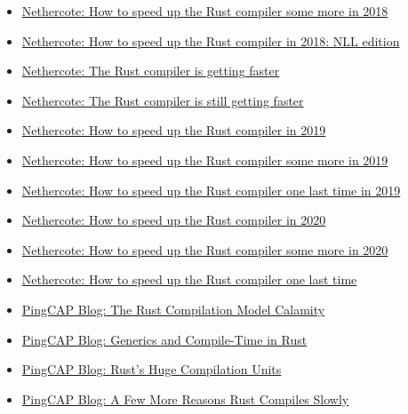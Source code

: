 \documentclass[12pt, a4paper]{report}
\begin{document}
\begin{itemize}[noitemsep]
\begin{itemize}[noitemsep]
	\item \href{https://blog.mozilla.org/nnethercote/2018/06/05/how-to-speed-up-the-rust-compiler-some-more-in-2018/}{\Square Nethercote: How to speed up the Rust compiler some more in 2018}
	\item \href{https://blog.mozilla.org/nnethercote/2018/11/06/how-to-speed-up-the-rust-compiler-in-2018-nll-edition/}{\Square Nethercote: How to speed up the Rust compiler in 2018: NLL edition}
	\item \href{https://blog.mozilla.org/nnethercote/2018/05/17/the-rust-compiler-is-getting-faster/}{\Square Nethercote: The Rust compiler is getting faster}
	\item \href{https://blog.mozilla.org/nnethercote/2019/07/25/the-rust-compiler-is-still-getting-faster/}{\Square Nethercote: The Rust compiler is still getting faster}
	\item \href{https://blog.mozilla.org/nnethercote/2019/07/17/how-to-speed-up-the-rust-compiler-in-2019/}{\Square Nethercote: How to speed up the Rust compiler in 2019}
	\item \href{https://blog.mozilla.org/nnethercote/2019/10/11/how-to-speed-up-the-rust-compiler-some-more-in-2019/}{\Square Nethercote: How to speed up the Rust compiler some more in 2019}
	\item \href{https://blog.mozilla.org/nnethercote/2019/12/11/how-to-speed-up-the-rust-compiler-one-last-time-in-2019/}{\Square Nethercote: How to speed up the Rust compiler one last time in 2019}
	\item \href{https://blog.mozilla.org/nnethercote/2020/04/24/how-to-speed-up-the-rust-compiler-in-2020/}{\Square Nethercote: How to speed up the Rust compiler in 2020}
	\item \href{https://blog.mozilla.org/nnethercote/2020/08/05/how-to-speed-up-the-rust-compiler-some-more-in-2020/}{\Square Nethercote: How to speed up the Rust compiler some more in 2020}
	\item \href{https://blog.mozilla.org/nnethercote/2020/09/08/how-to-speed-up-the-rust-compiler-one-last-time/}{\Square Nethercote: How to speed up the Rust compiler one last time}
	\item \href{https://pingcap.com/blog/rust-compilation-model-calamity}{\Square PingCAP Blog: The Rust Compilation Model Calamity}
	\item \href{https://pingcap.com/blog/generics-and-compile-time-in-rust}{\Square PingCAP Blog: Generics and Compile-Time in Rust}
	\item \href{https://pingcap.com/blog/rust-huge-compilation-units}{\Square PingCAP Blog: Rust's Huge Compilation Units}
	\item \href{https://pingcap.com/blog/reasons-rust-compiles-slowly}{\Square PingCAP Blog: A Few More Reasons Rust Compiles Slowly}
	\end{itemize}

\end{itemize}
\end{document}
